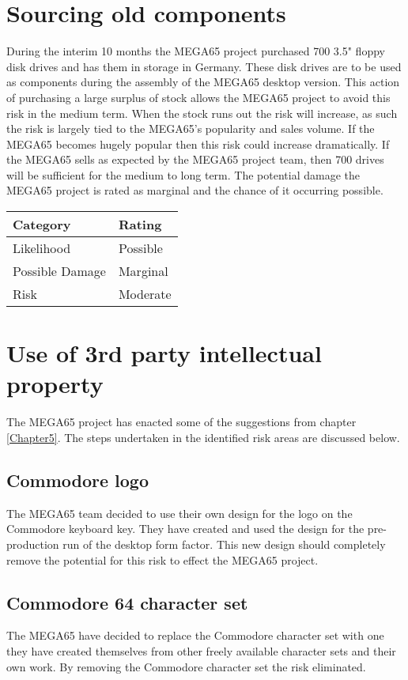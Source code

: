 \section{Sourcing old components}
During the interim 10 months the MEGA65 project purchased 700 3.5" floppy disk drives and has them in storage in Germany. These disk drives are to be used as components during the assembly of the MEGA65 desktop version. This action of purchasing a large surplus of stock allows the MEGA65 project to avoid this risk in the medium term. When the stock runs out the risk will increase, as such the risk is largely tied to the MEGA65's popularity and sales volume. If the MEGA65 becomes hugely popular then this risk could increase dramatically. If the MEGA65 sells as expected by the MEGA65 project team, then 700 drives will be sufficient for the medium to long term. The potential damage the MEGA65 project is rated as marginal and the chance of it occurring possible. \\

\begin{tabular}{l|l} %
    	\textbf{Category} 	&	\textbf{Rating} \\
      \hline
     Likelihood			&	Possible \\
     Possible Damage 	& 	Marginal \\
     Risk 				&	Moderate		\\	
    \end{tabular}


\section{Use of 3rd party intellectual property}
The MEGA65 project has enacted some of the suggestions from chapter \ref{Chapter5}. The steps undertaken in the identified risk areas are discussed below.

\subsection{Commodore logo}
The MEGA65 team decided to use their own design for the logo on the Commodore keyboard key. They have created and used the design for the pre-production run of the desktop form factor. This new design should completely remove the potential for this risk to effect the MEGA65 project.

\subsection{Commodore 64 character set}
The MEGA65 have decided to replace the Commodore character set with one they have created themselves from other freely available character sets and their own work. By removing the Commodore character set the risk eliminated. 

